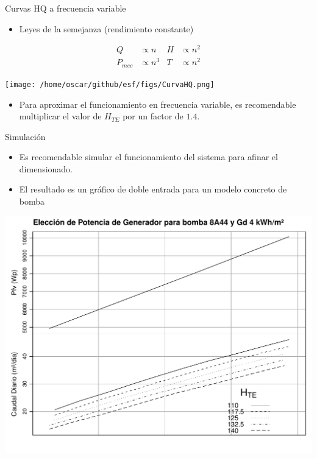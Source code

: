 \documentclass[xcolor={usenames,svgnames,dvipsnames}]{beamer}
\begin{document}
\begin{frame}[label={sec:orgb215770}]{Curvas HQ a frecuencia variable}
\begin{itemize}
\item Leyes de la semejanza (rendimiento constante)
\end{itemize}

\begin{align*}
Q &\propto n &H &\propto n^{2}\\
P_{mec} &\propto n^{3} &T &\propto n^{2}
\end{align*}

\begin{center}
\texttt{[image: /home/oscar/github/esf/figs/CurvaHQ.png]}
\end{center}

\begin{itemize}
\item Para aproximar el funcionamiento en frecuencia variable, es recomendable \alert{multiplicar el valor de \(H_{TE}\) por un factor de \(1.4\)}.
\end{itemize}
\end{frame}

\begin{frame}[label={sec:org131b559}]{Simulación}
\begin{itemize}
\item Es recomendable simular el funcionamiento del sistema para afinar el dimensionado.
\item El resultado es un gráfico de doble entrada para un modelo concreto de bomba
\end{itemize}
\begin{center}
\includegraphics[width=.9\linewidth]{../figs/AbacoBomba.pdf}
\end{center}
\end{frame}
\end{document}
